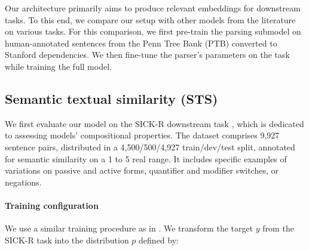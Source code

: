 Our architecture primarily aims to produce relevant embeddings for downstream tasks. To this end, we compare our setup with other models from the literature on various tasks. For this comparison, we first pre-train the parsing submodel on human-annotated sentences from the Penn Tree Bank (PTB) \parencite{marcus_94} converted to Stanford dependencies. We then fine-tune the parser's parameters on the task while training the full model.


\subsection{Semantic textual similarity (STS)}
\label{sec:sts}

We first evaluate our model on the SICK-R downstream task \parencite{marelli_14}, which is dedicated to assessing models' compositional properties. 
The dataset comprises 9,927 sentence pairs, distributed in a 4,500/500/4,927 train/dev/test split, annotated for semantic similarity on a 1 to 5 real range. It includes specific examples of variations on passive and active forms, quantifier and modifier switches, or negations. 


\paragraph{Training configuration}

We use a similar training procedure
as in \textcite{tai_15}. We transform the target $y$ from the SICK-R task into the distribution $p$ defined by:

